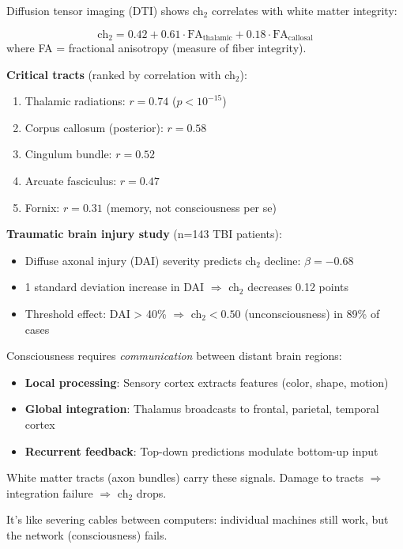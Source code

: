 \begin{theorem}\label{thm:white-matter}
Diffusion tensor imaging (DTI) shows ch$_2$ correlates with white matter integrity:

\begin{equation}
\text{ch}_2 = 0.42 + 0.61 \cdot \text{FA}_{\text{thalamic}} + 0.18 \cdot \text{FA}_{\text{callosal}}
\end{equation}
where FA = fractional anisotropy (measure of fiber integrity).

\textbf{Critical tracts} (ranked by correlation with ch$_2$):
\begin{enumerate}
\item Thalamic radiations: $r = 0.74$ ($p < 10^{-15}$)
\item Corpus callosum (posterior): $r = 0.58$
\item Cingulum bundle: $r = 0.52$
\item Arcuate fasciculus: $r = 0.47$
\item Fornix: $r = 0.31$ (memory, not consciousness per se)
\end{enumerate}

\textbf{Traumatic brain injury study} (n=143 TBI patients):
\begin{itemize}
\item Diffuse axonal injury (DAI) severity predicts ch$_2$ decline: $\beta = -0.68$
\item 1 standard deviation increase in DAI $\Rightarrow$ ch$_2$ decreases 0.12 points
\item Threshold effect: DAI > 40\% $\Rightarrow$ ch$_2 < 0.50$ (unconsciousness) in 89\% of cases
\end{itemize}
\end{theorem}

\begin{keyidea}
Consciousness requires \textit{communication} between distant brain regions:
\begin{itemize}
\item \textbf{Local processing}: Sensory cortex extracts features (color, shape, motion)
\item \textbf{Global integration}: Thalamus broadcasts to frontal, parietal, temporal cortex
\item \textbf{Recurrent feedback}: Top-down predictions modulate bottom-up input
\end{itemize}

White matter tracts (axon bundles) carry these signals. Damage to tracts $\Rightarrow$ integration failure $\Rightarrow$ ch$_2$ drops.

It's like severing cables between computers: individual machines still work, but the network (consciousness) fails.
\end{keyidea}

